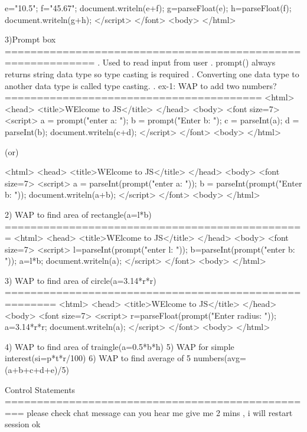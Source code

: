 		e="10.5";
		f="45.67";
		document.writeln(e+f);
		g=parseFloat(e);
		h=parseFloat(f);
		document.writeln(g+h);
	</script>
   </font>
  <body>
</html>

3)Prompt box
============================================================
. Used to read input from user
. prompt() always returns string data type so type casting is required
. Converting one data type to another data type is called type casting.
. ex-1: WAP to add two numbers?
========================================
<html>
  <head>
   <title>WElcome to JS</title>
  </head>
  <body>
    <font size=7>
     <script>
		a = prompt("enter a: ");
		b = prompt("Enter b: ");
		c = parseInt(a);
		d = parseInt(b);
		document.writeln(c+d);
	</script>
   </font>
  <body>
</html>

(or)

<html>
  <head>
   <title>WElcome to JS</title>
  </head>
  <body>
    <font size=7>
     <script>
		a = parseInt(prompt("enter a: "));
		b = parseInt(prompt("Enter b: "));
		document.writeln(a+b);		
	</script>
   </font>
  <body>
</html>

2) WAP to find area of rectangle(a=l*b)
===============================================
<html>
  <head>
   <title>WElcome to JS</title>
  </head>
  <body>
    <font size=7>
     <script>
		l=parseInt(prompt("enter l: "));
		b=parseInt(prompt("enter b: "));
		a=l*b;
		document.writeln(a);
	</script>
   </font>
  <body>
</html>

3) WAP to find area of circle(a=3.14*r*r)
======================================================
<html>
  <head>
   <title>WElcome to JS</title>
  </head>
  <body>
    <font size=7>
     <script>
		r=parseFloat(prompt("Enter radius: "));
		a=3.14*r*r;
		document.writeln(a);
	</script>
   </font>
  <body>
</html>

4) WAP to find area of traingle(a=0.5*b*h)
5) WAP for simple interest(si=p*t*r/100)
6) WAP to find average of 5 numbers(avg=(a+b+c+d+e)/5)


Control Statements
=================================================
please check chat message
can you hear me
give me 2 mins , i will restart session ok
